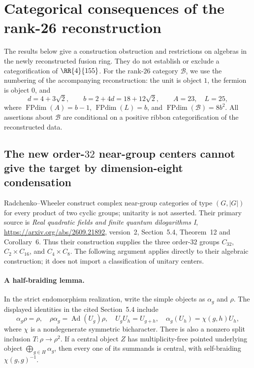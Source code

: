 \section{Categorical consequences of the rank-26 reconstruction}
\label{sec:r155-new-categorical}

The results below give a construction obstruction and restrictions on
algebras in the newly reconstructed fusion ring. They do not establish or
exclude a categorification of $\RR{4}{155}$. For the rank-$26$ category
$\mathcal B$, we use the numbering of the accompanying reconstruction:
the unit is object $1$, the fermion is object $0$, and
\[
 d=4+3\sqrt2,\qquad b=2+4d=18+12\sqrt2,\qquad
 A=23,\quad L=25,
\]
where $\operatorname{FPdim}(A)=b-1$, $\operatorname{FPdim}(L)=b$, and
$\operatorname{FPdim}(\mathcal B)=8b^2$. All assertions about
$\mathcal B$ are conditional on a positive ribbon categorification of
the reconstructed data.

\subsection{The new order-$32$ near-group centers cannot give the target
by dimension-eight condensation}

Radchenko--Wheeler construct complex near-group categories of type
$(G,|G|)$ for every product of two cyclic groups; unitarity is not
asserted. Their primary source is
\emph{Real quadratic fields and finite quantum dilogarithms I},
\url{https://arxiv.org/abs/2609.21892}, version~2, Section~5.4,
Theorem~12 and Corollary~6. Thus their construction supplies the three
order-$32$ groups $C_{32}$, $C_2\times C_{16}$, and $C_4\times C_8$.
The following argument applies directly to their algebraic construction;
it does not import a classification of unitary centers.

\paragraph{A half-braiding lemma.}
In the strict endomorphism realization, write the simple objects as
$\alpha_g$ and $\rho$. The displayed identities in the cited Section~5.4
include
\[
 \alpha_g\rho=\rho,\quad
 \rho\alpha_g=\operatorname{Ad}(U_g)\rho,\quad
 U_gU_h=U_{g+h},\quad
 \alpha_g(U_h)=\chi(g,h)U_h,
\]
where $\chi$ is a nondegenerate symmetric bicharacter. There is also a
nonzero split inclusion $T:\rho\longrightarrow\rho^2$.
If a central object $Z$ has multiplicity-free pointed underlying object
$\bigoplus_{g\in H}\alpha_g$, then every one of its summands is central,
with self-braiding $\chi(g,g)^{-1}$.

